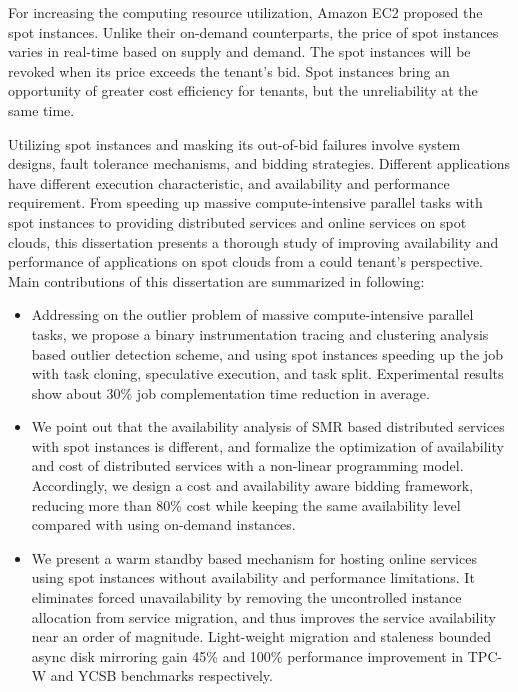\begin{eabstract}
   
   For increasing the computing resource utilization, Amazon EC2 proposed the 
   spot instances. Unlike their on-demand counterparts, the price of spot instances 
   varies in real-time based on supply and demand. The spot instances will be revoked 
   when its price exceeds the tenant's bid. Spot instances bring an opportunity 
   of greater cost efficiency for tenants, but the unreliability at the same time.

   Utilizing spot instances and masking its out-of-bid failures involve 
   system designs, fault tolerance mechanisms, and bidding strategies. Different 
   applications have different execution characteristic, and availability and 
   performance requirement. From speeding up massive compute-intensive parallel tasks 
   with spot instances to providing distributed services and online services on spot 
   clouds, this dissertation presents a thorough study of improving availability and 
   performance of applications on spot clouds from a could tenant's perspective. Main 
   contributions of this dissertation are summarized in following: 

  \begin{itemize}
    \item Addressing on the outlier problem of massive compute-intensive parallel tasks, 
    we propose a binary instrumentation tracing and clustering analysis based outlier 
    detection scheme, and using spot instances speeding up the job with task cloning, 
    speculative execution, and task split. Experimental results show about 30\% job 
    complementation time reduction in average.
    \item We point out that the availability analysis of SMR based distributed services 
    with spot instances is different, and formalize the optimization of availability and 
    cost of distributed services with a non-linear programming model. Accordingly, we 
    design a cost and availability aware bidding framework, reducing more than 80\% cost 
    while keeping the same availability level compared with using on-demand instances.
    \item We present a warm standby based mechanism for hosting online services using 
    spot instances without availability and performance limitations. It eliminates forced 
    unavailability by removing the uncontrolled instance allocation from service migration, 
    and thus improves the service availability near an order of magnitude. Light-weight 
    migration and staleness bounded async disk mirroring gain 45\% and 100\% performance 
    improvement in TPC-W and YCSB benchmarks respectively.
  \end{itemize}

\end{eabstract}

